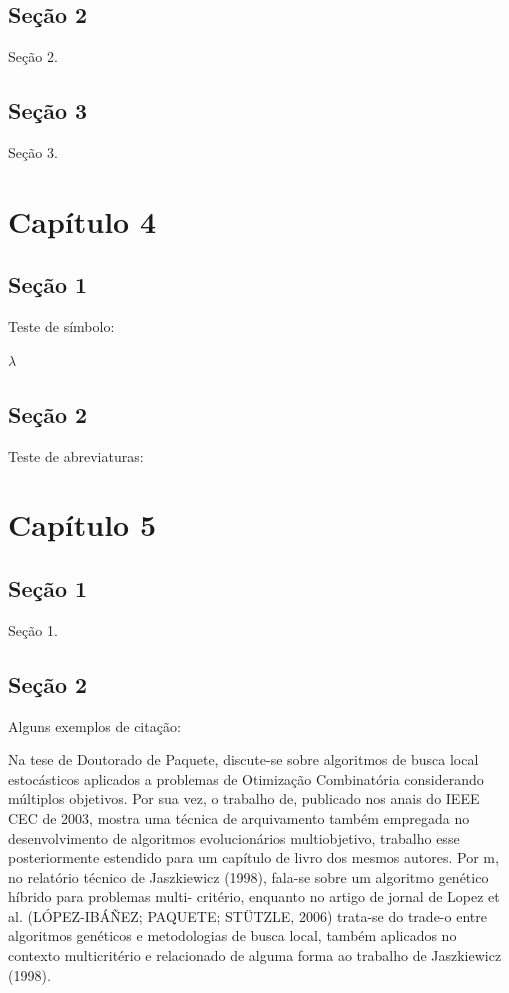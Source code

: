 \documentclass[
	12pt,			%
	openright,		%
	oneside,	
	a4paper,		%
	english,		%
	brazil			%
]{abntex2/abntex2}  %
\begin{document}
	\section{Seção 2}
	
		Seção 2.

	\section{Seção 3}
	
		Seção 3.
		
\chapter{Capítulo 4}

	\section{Seção 1}
	
		Teste de símbolo:
		
		$\lambda$
		
	\section{Seção 2}
	
		Teste de abreviaturas:
		
\chapter{Capítulo 5}

	\section{Seção 1}
	
		Seção 1.
	
	\section{Seção 2}
	
		Alguns exemplos de citação:

		Na tese de Doutorado de Paquete, discute-se sobre algoritmos de busca local estocásticos aplicados a problemas de Otimização Combinatória considerando múltiplos objetivos. Por sua vez, o trabalho de, publicado nos anais do IEEE CEC de 2003, mostra uma técnica de arquivamento também empregada no desenvolvimento de algoritmos evolucionários multiobjetivo, trabalho esse posteriormente estendido para um capítulo de livro dos mesmos autores. Por m, no relatório técnico de Jaszkiewicz (1998), fala-se sobre um algoritmo genético híbrido para problemas multi- critério, enquanto no artigo de jornal de Lopez et al. (LÓPEZ-IBÁÑEZ; PAQUETE; STÜTZLE, 2006) trata-se do trade-o entre algoritmos genéticos e metodologias de busca local, também aplicados no contexto multicritério e relacionado de alguma forma ao trabalho de Jaszkiewicz (1998).
\end{document}
